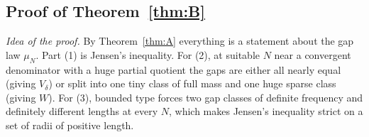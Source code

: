 \documentclass[11pt]{amsart}
\theoremstyle{remark}
\newcommand{\Vd}{V_\delta}
\begin{document}


\subsection{Proof of Theorem~\ref{thm:B}}\label{sec:proofB}
\emph{Idea of the proof.} By Theorem~\ref{thm:A} everything is a statement about the gap law $\mu_N$. Part (1) is Jensen's inequality. For (2), at suitable $N$ near a convergent denominator with a huge partial quotient the gaps are either all nearly equal (giving $\Vd$) or split into one tiny class of full mass and one huge sparse class (giving $W$). For (3), bounded type forces two gap classes of definite frequency and definitely different lengths at every $N$, which makes Jensen's inequality strict on a set of radii of positive length.
\end{document}
